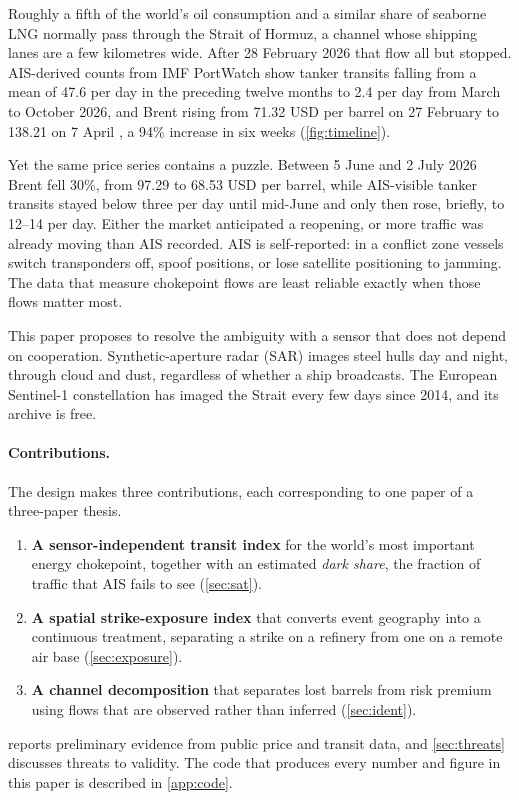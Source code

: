 \documentclass{article}
\begin{document}
Roughly a fifth of the world's oil consumption and a similar share of seaborne LNG normally pass through the Strait of Hormuz, a channel whose shipping lanes are a few kilometres wide. After 28 February 2026 that flow all but stopped. AIS-derived counts from IMF PortWatch \citep{portwatch} show tanker transits falling from a mean of 47.6 per day in the preceding twelve months to 2.4 per day from March to October 2026, and Brent rising from 71.32 USD per barrel on 27 February to 138.21 on 7 April \citep{eia_spot}, a 94\% increase in six weeks (\cref{fig:timeline}).

Yet the same price series contains a puzzle. Between 5 June and 2 July 2026 Brent fell 30\%, from 97.29 to 68.53 USD per barrel, while AIS-visible tanker transits stayed below three per day until mid-June and only then rose, briefly, to 12--14 per day. Either the market anticipated a reopening, or more traffic was already moving than AIS recorded. AIS is self-reported: in a conflict zone vessels switch transponders off, spoof positions, or lose satellite positioning to jamming. The data that measure chokepoint flows are least reliable exactly when those flows matter most.

This paper proposes to resolve the ambiguity with a sensor that does not depend on cooperation. Synthetic-aperture radar (SAR) images steel hulls day and night, through cloud and dust, regardless of whether a ship broadcasts. The European Sentinel-1 constellation \citep{torres2012} has imaged the Strait every few days since 2014, and its archive is free.

\paragraph{Contributions.} The design makes three contributions, each corresponding to one paper of a three-paper thesis.
\begin{enumerate}
  \item \textbf{A sensor-independent transit index} for the world's most important energy chokepoint, together with an estimated \emph{dark share}, the fraction of traffic that AIS fails to see (\cref{sec:sat}).
  \item \textbf{A spatial strike-exposure index} that converts event geography into a continuous treatment, separating a strike on a refinery from one on a remote air base (\cref{sec:exposure}).
  \item \textbf{A channel decomposition} that separates lost barrels from risk premium using flows that are observed rather than inferred (\cref{sec:ident}).
\end{enumerate}
 reports preliminary evidence from public price and transit data, and \cref{sec:threats} discusses threats to validity. The code that produces every number and figure in this paper is described in \cref{app:code}.
\end{document}
